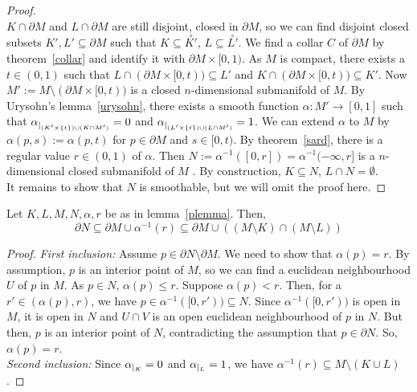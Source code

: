 \documentclass[a4paper,11pt]{article}
\begin{document}
\begin{proof}\cite{conner}\\
    \(K\cap\partial M\) and \(L\cap\partial M\) are still disjoint, closed in \(\partial M\), so we can find disjoint closed subsets \(K',L'\subseteq\partial M\) such that \(K\subseteq\overset{\circ}{K'}\), \(L\subseteq\overset{\circ}{L'}\). 
    We find a collar \(C\) of \(\partial M\) by theorem\ \ref{collar} and identify it with \(\partial M\times[0,1)\). 
    As \(M\) is compact, there exists a \(t\in (0,1)\) such that \(L\cap (\partial M\times [0,t))\subseteq L'\) and \(K\cap (\partial M\times [0,t))\subseteq K'\). 
    Now \(M':=M\setminus (\partial M\times [0,t))\) is a closed \(n\)-dimensional submanifold of \(M\). By Urysohn's lemma\ \ref{urysohn}, there exists a smooth function \(\alpha:M'\to[0,1]\) such that \(\alpha_{|_{(K'\times \{t\})\cup (K\cap M')}}=0\) and \(\alpha_{|_{(L'\times \{t\})\cup(L\cap M')}}=1\). 
    We can extend \(\alpha\) to \(M\) by \(\alpha(p,s):=\alpha(p,t)\) for \(p\in \partial M\) and \(s\in[0,t)\). 
    By theorem\ \ref{sard}, there is a regular value \(r\in(0,1)\) of \(\alpha\). 
    Then \(N:=\alpha^{-1}([0,r])=\alpha^{-1}(-\infty,r]\) is a \(n\)-dimensional closed submanifold of \(M\)%
    . By construction, \(K\subseteq N\), \(L\cap N=\emptyset\).\\
    It remains to show that \(N\) is smoothable, but we will omit the proof here.
\end{proof}


\begin{lemma}\label{plemma2}
    Let \(K,L,M,N,\alpha,r\) be as in lemma\ \ref{plemma}. Then,
    \[\partial N\subseteq \partial M\cup \alpha^{-1}(r)\subseteq \partial M\cup((M\setminus K)\cap(M\setminus L))\]
\end{lemma}

\begin{proof}\cite{zhang}
    \textit{First inclusion:} Assume \(p\in\partial N\setminus \partial M\). We need to show that \(\alpha(p)=r\). By assumption, \(p\) is an interior point of \(M\), so we can find a euclidean neighbourhood \(U\) of \(p\) in \(M\). 
    As \(p\in N\), \(\alpha(p)\leq r\). Suppose \(\alpha(p)<r\). Then, for a \(r'\in(\alpha(p),r)\), we have \(p\in\alpha^{-1}([0,r'))\subseteq N\). Since \(\alpha^{-1}([0,r'))\) is open in \(M\), it is open in \(N\) and \(U\cap V\) is an open euclidean neighbourhood of \(p\) in \(N\). But then, \(p\) is an interior point of \(N\), contradicting the assumption that \(p\in\partial N\). So, \(\alpha(p)=r\).\\
    \textit{Second inclusion:} Since \(\alpha_{|_{K}}=0\) and \(\alpha_{|_{L}}=1\), we have \(\alpha^{-1}(r)\subseteq M\setminus (K\cup L)\).
\end{proof}
\end{document}
